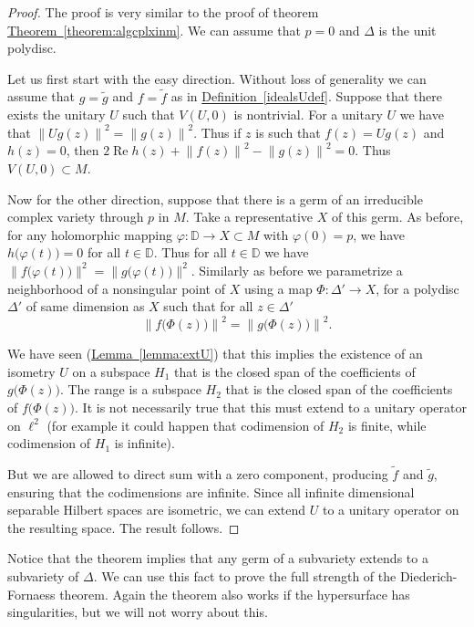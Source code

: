 \documentclass[12pt,openany]{book}
\renewcommand{\Re}{\operatorname{Re}}
\newcommand{\snorm}[1]{\lVert {#1} \rVert}
\newcommand{\norm}[1]{\left\lVert {#1} \right\rVert}
\newcommand{\bD}{{\mathbb{D}}}
\theoremstyle{plain}
\theoremstyle{remark}
\theoremstyle{definition}
\theoremstyle{exercise}
\theoremstyle{example}
\newcommand{\thmref}[1]{\hyperref[#1]{Theorem~\ref*{#1}}}
\newcommand{\lemmaref}[1]{\hyperref[#1]{Lemma~\ref*{#1}}}
\newcommand{\defnref}[1]{\hyperref[#1]{Definition~\ref*{#1}}}
\begin{document}
\begin{proof}
The proof is very similar to the proof of theorem
\thmref{theorem:algcplxinm}.
We can assume that $p=0$ and $\Delta$ is the unit polydisc.

Let us first start with the easy direction.  
Without loss of generality we can assume that $g = \tilde{g}$ and
$f = \tilde{f}$ as in \defnref{idealsUdef}.
Suppose that there
exists the unitary $U$ such that $V(U,0)$ is
nontrivial.  For a unitary $U$
we have that $\norm{Ug(z)}^2 = \norm{g(z)}^2$.  Thus if $z$
is such that $f(z) = Ug(z)$ and $h(z) = 0$, then
$2 \Re h(z) + \norm{f(z)}^2-\norm{g(z)}^2 = 0$.  Thus $V(U,0) \subset M$.

Now for the other direction, suppose that there is a germ of
an irreducible complex variety through $p$ in $M$.
Take a representative $X$ of this germ.
As before, for any
holomorphic mapping
$\varphi \colon \bD \to X \subset M$
with $\varphi(0) = p$, we have
$h\bigl(\varphi(t)\bigr) = 0$ for all $t \in \bD$.  Thus
for all $t \in \bD$ we have
$\snorm{f\bigl(\varphi(t)\bigr)}^2 = \snorm{g\bigl(\varphi(t)\bigr)}^2$.
Similarly as before we parametrize a neighborhood of a nonsingular
point of $X$ using a map $\Phi \colon \Delta' \to X$, for a polydisc
$\Delta'$ of same dimension as $X$ such that for all $z \in \Delta'$
\begin{equation}
\norm{f\bigl(\Phi(z)\bigr)}^2 = \norm{g\bigl(\Phi(z)\bigr)}^2 .
\end{equation}

We have seen (\lemmaref{lemma:extU}) that this implies the existence of
an isometry $U$
on a subspace $H_1$ that is the closed span of the coefficients of
$g\bigl(\Phi(z)\bigr)$.  The range is a subspace $H_2$ that is
the closed span of the coefficients of
$f\bigl(\Phi(z)\bigr)$.  It is not necessarily true that this must extend to
a unitary operator on $\ell^2$ (for example it could happen that codimension
of $H_2$ is finite, while codimension of $H_1$ is infinite).

But we are allowed to direct sum with a zero component, producing $\tilde{f}$
and $\tilde{g}$, ensuring that the codimensions are infinite.  Since all
infinite dimensional separable Hilbert spaces are isometric, we can extend
$U$ to a unitary operator on the resulting space.
The result follows.
\end{proof}

Notice that the theorem implies that any germ of a subvariety extends to
a subvariety of $\Delta$.  We can use this fact to prove the full strength
of the Diederich-Fornaess theorem.  Again the theorem also works if the
hypersurface has singularities, but we will not worry about this.
\end{document}
